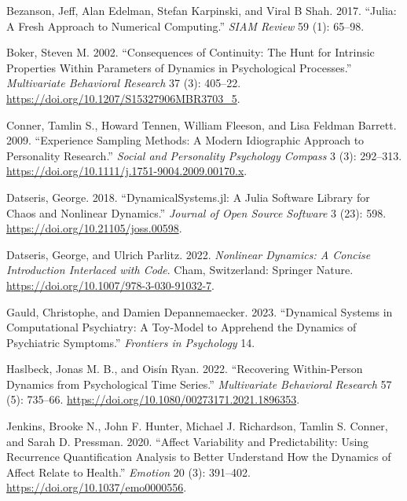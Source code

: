 \documentclass[
  letterpaper,
  DIV=11,
  numbers=noendperiod]{scrartcl}
\newlength{\cslhangindent}
\newlength{\cslentryspacingunit} %
\newenvironment{CSLReferences}[2] %
 {%
  \setlength{\parindent}{0pt}
  \ifodd #1
  \let\oldpar\par
  \def\par{\hangindent=\cslhangindent\oldpar}
  \fi
  \setlength{\parskip}{#2\cslentryspacingunit}
 }%
 {}
\begin{document}
\hypertarget{refs}{}
\begin{CSLReferences}{1}{0}
\leavevmode{}%
Bezanson, Jeff, Alan Edelman, Stefan Karpinski, and Viral B Shah. 2017.
{``Julia: {A} Fresh Approach to Numerical Computing.''} \emph{SIAM
Review} 59 (1): 65--98.

\leavevmode{}%
Boker, Steven M. 2002. {``Consequences of {Continuity}: {The Hunt} for
{Intrinsic Properties} Within {Parameters} of {Dynamics} in
{Psychological Processes}.''} \emph{Multivariate Behavioral Research} 37
(3): 405--22. \url{https://doi.org/10.1207/S15327906MBR3703_5}.

\leavevmode{}%
Conner, Tamlin S., Howard Tennen, William Fleeson, and Lisa Feldman
Barrett. 2009. {``Experience {Sampling Methods}: {A Modern Idiographic
Approach} to {Personality Research}.''} \emph{Social and Personality
Psychology Compass} 3 (3): 292--313.
\url{https://doi.org/10.1111/j.1751-9004.2009.00170.x}.

\leavevmode{}%
Datseris, George. 2018. {``{DynamicalSystems}.jl: {A Julia} Software
Library for Chaos and Nonlinear Dynamics.''} \emph{Journal of Open
Source Software} 3 (23): 598. \url{https://doi.org/10.21105/joss.00598}.

\leavevmode{}%
Datseris, George, and Ulrich Parlitz. 2022. \emph{Nonlinear Dynamics:
{A} Concise Introduction Interlaced with Code}. {Cham, Switzerland}:
{Springer Nature}. \url{https://doi.org/10.1007/978-3-030-91032-7}.

\leavevmode{}%
Gauld, Christophe, and Damien Depannemaecker. 2023. {``Dynamical Systems
in Computational Psychiatry: {A} Toy-Model to Apprehend the Dynamics of
Psychiatric Symptoms.''} \emph{Frontiers in Psychology} 14.

\leavevmode{}%
Haslbeck, Jonas M. B., and Oisín Ryan. 2022. {``Recovering
{Within-Person Dynamics} from {Psychological Time Series}.''}
\emph{Multivariate Behavioral Research} 57 (5): 735--66.
\url{https://doi.org/10.1080/00273171.2021.1896353}.

\leavevmode{}%
Jenkins, Brooke N., John F. Hunter, Michael J. Richardson, Tamlin S.
Conner, and Sarah D. Pressman. 2020. {``Affect Variability and
Predictability: {Using} Recurrence Quantification Analysis to Better
Understand How the Dynamics of Affect Relate to Health.''}
\emph{Emotion} 20 (3): 391--402.
\url{https://doi.org/10.1037/emo0000556}.


\end{CSLReferences}
\end{document}
